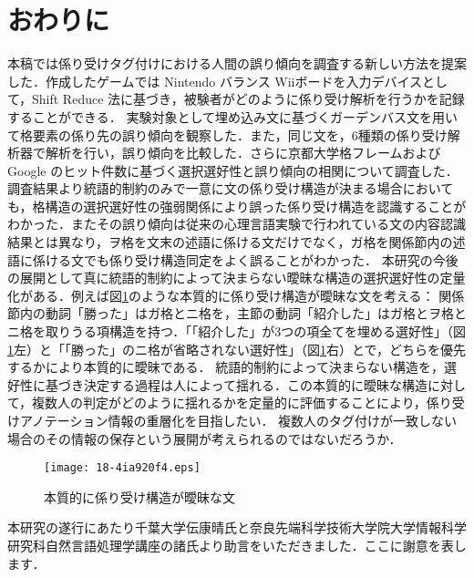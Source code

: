 \documentclass[japanese]{jnlp_1.4}
\def\modified#1{}
\begin{document}
\section{おわりに} \label{sec:6}

本稿では係り受けタグ付けにおける人間の誤り傾向を調査する新しい方法を提案した．作成したゲームでは Nintendo バランス Wiiボードを入力デバイスとして，Shift Reduce 法に基づき，被験者がどのように係り受け解析を行うかを記録することができる．
実験対象として埋め込み文に基づくガーデンバス文を用いて格要素の係り先の誤り傾向を観察した．また，同じ文を，6種類の係り受け解析器で解析を行い，誤り傾向を比較した．さらに京都大学格フレームおよび Google のヒット件数に基づく選択選好性と誤り傾向の相関について調査した．調査結果より統語的制約のみで一意に文の係り受け構造が決まる場合においても，格構造の選択選好性の強弱関係により誤った係り受け構造を認識することがわかった．またその誤り傾向は従来の心理言語実験で行われている文の内容認識結果とは異なり，ヲ格を文末の述語に係ける文だけでなく，ガ格を関係節内の述語に係ける文でも係り受け構造同定をよく誤ることがわかった．
本研究の今後の展開として真に統語的制約によって決まらない曖昧な構造の選択選好性の定量化がある．例えば図\ref{fig:juudouka}のような本質的に係り受け構造が曖昧な文を考える：
関係節内の動詞「勝った」はガ格とニ格を，主節の動詞「紹介した」はガ格とヲ格とニ格を取りうる項構造を持つ．「「紹介した」が3つの項全てを埋める選好性」（図\ref{fig:juudouka}左）と「「勝った」のニ格が省略されない選好性」（図\ref{fig:juudouka}右）とで，どちらを優先するかにより本質的に曖昧である．
統語的制約によって決まらない構造を，選好性に基づき決定する過程は人によって揺れる．この本質的に曖昧な構造に対して，複数人の判定がどのように揺れるかを定量的に評価することにより，係り受けアノテーション情報の重層化を目指したい．
\modified{アノテーションスキーマとして一致率を上げる展開とは別に，}複数人のタグ付けが一致しない場合のその情報の保存という展開が考えられるのではないだろうか．


\begin{figure}[t]
\begin{center}
\texttt{[image: 18-4ia920f4.eps]} 
\end{center}
\caption{本質的に係り受け構造が曖昧な文}
 \label{fig:juudouka}
\end{figure}



\acknowledgment

本研究の遂行にあたり千葉大学伝康晴氏と奈良先端科学技術大学院大学情報科学研究科自然言語処理学講座の諸氏より助言をいただきました．ここに謝意を表します．
\end{document}
